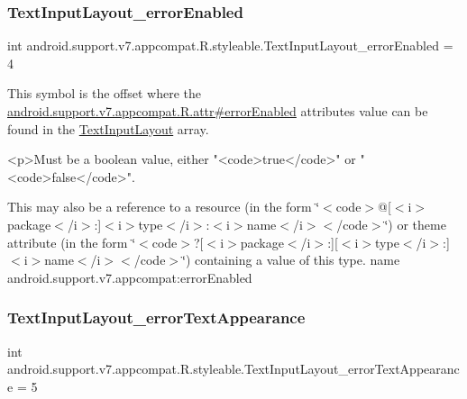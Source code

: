 \subsubsection{\texorpdfstring{Text\+Input\+Layout\+\_\+error\+Enabled}{TextInputLayout\_errorEnabled}}
{\footnotesize\ttfamily int android.\+support.\+v7.\+appcompat.\+R.\+styleable.\+Text\+Input\+Layout\+\_\+error\+Enabled = 4\hspace{0.3cm}{\ttfamily [static]}}

This symbol is the offset where the \hyperlink{classandroid_1_1support_1_1v7_1_1appcompat_1_1R_1_1attr_a6b82c15fbb66c136709becccec25f526}{android.\+support.\+v7.\+appcompat.\+R.\+attr\#error\+Enabled} attribute\textquotesingle{}s value can be found in the \hyperlink{classandroid_1_1support_1_1v7_1_1appcompat_1_1R_1_1styleable_a618db13ebe8aab96f9d951a0d1c7d5bc}{Text\+Input\+Layout} array.

\begin{DoxyVerb}      <p>Must be a boolean value, either "<code>true</code>" or "<code>false</code>".
\end{DoxyVerb}
 

This may also be a reference to a resource (in the form \char`\"{}$<$code$>$@\mbox{[}$<$i$>$package$<$/i$>$\+:\mbox{]}$<$i$>$type$<$/i$>$\+:$<$i$>$name$<$/i$>$$<$/code$>$\char`\"{}) or theme attribute (in the form \char`\"{}$<$code$>$?\mbox{[}$<$i$>$package$<$/i$>$\+:\mbox{]}\mbox{[}$<$i$>$type$<$/i$>$\+:\mbox{]}$<$i$>$name$<$/i$>$$<$/code$>$\char`\"{}) containing a value of this type.  name android.\+support.\+v7.\+appcompat\+:error\+Enabled \mbox{\label{classandroid_1_1support_1_1v7_1_1appcompat_1_1R_1_1styleable_a061ba991b6d0e7f4f5d12421d1455f6d}} 
\subsubsection{\texorpdfstring{Text\+Input\+Layout\+\_\+error\+Text\+Appearance}{TextInputLayout\_errorTextAppearance}}
{\footnotesize\ttfamily int android.\+support.\+v7.\+appcompat.\+R.\+styleable.\+Text\+Input\+Layout\+\_\+error\+Text\+Appearance = 5\hspace{0.3cm}{\ttfamily [static]}}

